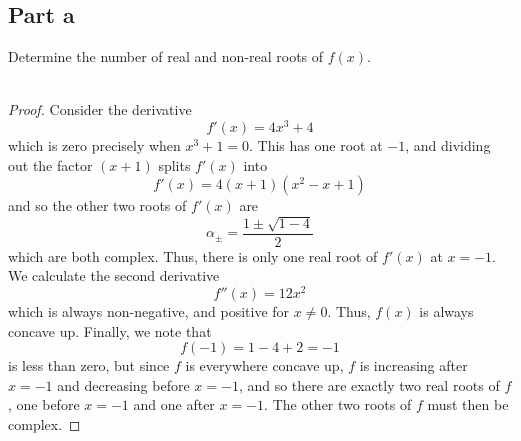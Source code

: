 \documentclass[12pt,reqno]{amsart}
\begin{document}
\subsection*{Part a}
Determine the number of real and non-real roots of $f(x)$.
\\
\\
\begin{proof}
    Consider the derivative
    \[
        f'(x) = 4x^3+4
    \]
    which is zero precisely when $x^3+1=0$. This has one root at $-1$, and
    dividing out the factor $(x+1)$ splits $f'(x)$ into
    \[
        f'(x) = 4(x+1)(x^2 -x+1)
    \]
    and so the other two roots of $f'(x)$ are
    \[
        \alpha_{\pm} = \frac{1\pm\sqrt{1-4}}{2}
    \]
    which are both complex. Thus, there is only one real root of $f'(x)$ at
    $x=-1$. We calculate the second derivative
    \[
        f''(x) = 12x^2
    \]
    which is always non-negative, and positive for $x\neq 0$. Thus, $f(x)$ is
    always concave up. Finally, we note that
    \[
        f(-1) = 1-4+2 = -1
    \]
    is less than zero, but since $f$ is everywhere concave up, $f$ is increasing
    after $x=-1$ and decreasing before $x=-1$, and so there are exactly two real
    roots of $f$, one before $x=-1$ and one after $x=-1$. The other two roots of
    $f$ must then be complex.
\end{proof}
\end{document}
